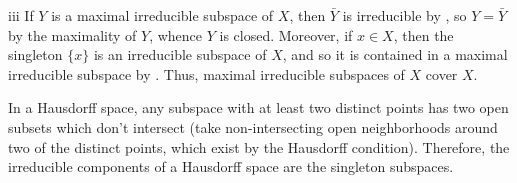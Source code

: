 \begin{partsolution}{iii}
If \(Y\) is a maximal irreducible subspace of \(X\), then \(\bar{Y}\) is irreducible by , so \(Y = \bar{Y}\) by the maximality of \(Y\), whence \(Y\) is closed.
Moreover, if \(x \in X\), then the singleton \(\{x\}\) is an irreducible subspace of \(X\), and so it is contained in a maximal irreducible subspace by .
Thus, maximal irreducible subspaces of \(X\) cover \(X\).

In a Hausdorff space, any subspace with at least two distinct points has two open subsets which don't intersect (take non-intersecting open neighborhoods around two of the distinct points, which exist by the Hausdorff condition).
Therefore, the irreducible components of a Hausdorff space are the singleton subspaces.
\end{partsolution}

